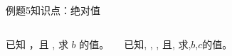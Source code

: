     \begin{frame}{例题5}{知识点：绝对值}
        \begin{columns}
                \begin{block}{}
                    已知 ，且 , 
                求 $b$ 的值。
                \end{block}

            \begin{block}{}
                已知, , 
                , 且, 求,$b$,$c$的值。
            \end{block}
        \end{columns}
    \end{frame}

